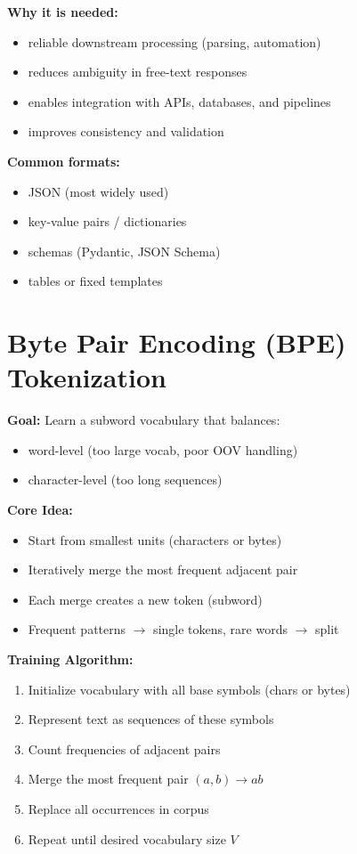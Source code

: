\documentclass[10pt,a4paper]{article}
\begin{document}
\textbf{Why it is needed:}
\begin{itemize}
\item reliable downstream processing (parsing, automation)
\item reduces ambiguity in free-text responses
\item enables integration with APIs, databases, and pipelines
\item improves consistency and validation
\end{itemize}

\textbf{Common formats:}
\begin{itemize}
\item JSON (most widely used)
\item key-value pairs / dictionaries
\item schemas (Pydantic, JSON Schema)
\item tables or fixed templates
\end{itemize}

\section{Byte Pair Encoding (BPE) Tokenization}

\textbf{Goal:} Learn a subword vocabulary that balances:
\begin{itemize}
\item word-level (too large vocab, poor OOV handling)
\item character-level (too long sequences)
\end{itemize}

\textbf{Core Idea:}
\begin{itemize}
\item Start from smallest units (characters or bytes)
\item Iteratively merge the most frequent adjacent pair
\item Each merge creates a new token (subword)
\item Frequent patterns $\rightarrow$ single tokens, rare words $\rightarrow$ split
\end{itemize}

\textbf{Training Algorithm:}
\begin{enumerate}
\item Initialize vocabulary with all base symbols (chars or bytes)
\item Represent text as sequences of these symbols
\item Count frequencies of adjacent pairs
\item Merge the most frequent pair $(a, b) \rightarrow ab$
\item Replace all occurrences in corpus
\item Repeat until desired vocabulary size $V$
\end{enumerate}
\end{document}
